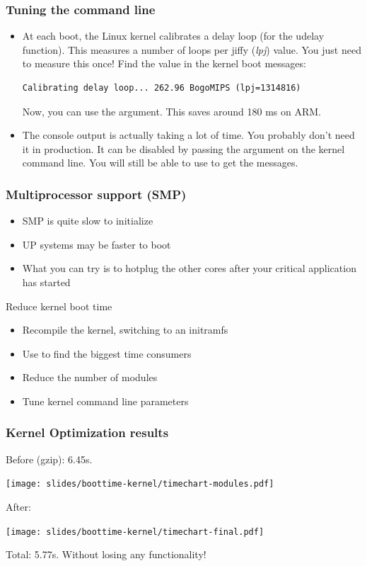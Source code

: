 \begin{frame}[fragile]
\frametitle{Tuning the command line}
\begin{itemize}
	\item At each boot, the Linux kernel calibrates a delay loop (for
		the udelay function). This measures a number of loops per
		jiffy ({\em lpj}) value. You just need to measure this once! Find
		the  value in the kernel boot messages:
\begin{block}{}
\small
\begin{verbatim}
Calibrating delay loop... 262.96 BogoMIPS (lpj=1314816)
\end{verbatim}
\end{block}
		Now, you can use the  argument. This saves
		around 180 ms on ARM.
	\item The console output is actually taking a lot of time. You
		probably don't need it in production. It can be disabled by
		passing the  argument on the kernel command line.
		You will still be able to use  to get the
		messages.
\end{itemize}
\end{frame}

\begin{frame}
  \frametitle{Multiprocessor support (SMP)}
  \begin{itemize}
	  \item SMP is quite slow to initialize
	  \item UP systems may be faster to boot
	  \item What you can try is to hotplug the other cores after your critical application has started
  \end{itemize}
\end{frame}

\setuplabframe
{Reduce kernel boot time}
{
\begin{itemize}
\item Recompile the kernel, switching to an initramfs
\item Use  to find the biggest
      time consumers
\item Reduce the number of modules
\item Tune kernel command line parameters
\end{itemize}
}

\begin{frame}
\frametitle{Kernel Optimization results}
Before (gzip): 6.45s.
\begin{center}
    \texttt{[image: slides/boottime-kernel/timechart-modules.pdf]}
\end{center}
After:
\begin{center}
    \texttt{[image: slides/boottime-kernel/timechart-final.pdf]}
\end{center}
Total: 5.77s. Without losing any functionality!
\end{frame}

